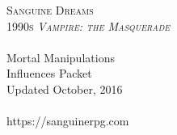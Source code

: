 \begin{titlepage}
\thispagestyle{empty}

\begin{center}

\vspace*{5cm}

\textsc{\Huge Sanguine Dreams}\\[0.5cm]

\textsc{\LARGE 1990s \emph{Vampire: the Masquerade}}\\[0.5cm]

\TitleRule \\[0.6cm]
{ \LARGE Mortal Manipulations}\\[0.2cm]
{ Influences Packet } \\[0.4cm]
{ Updated October, 2016 }\\[0.4cm]			%
\TitleRule \\[1.5cm]

\vspace{5.0cm}
{\large https://sanguinerpg.com}

\end{center}
\end{titlepage}


